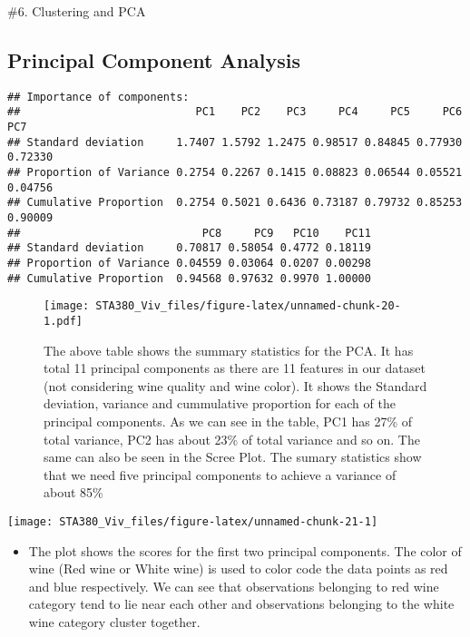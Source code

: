 \documentclass[
  12pt,
]{article}
\providecommand{\tightlist}{%
  \setlength{\itemsep}{0pt}\setlength{\parskip}{0pt}}
\begin{document}
\newpage

\#6. Clustering and PCA

\hypertarget{principal-component-analysis}{%
\subsection{Principal Component
Analysis}\label{principal-component-analysis}}

\begin{verbatim}
## Importance of components:
##                           PC1    PC2    PC3     PC4     PC5     PC6     PC7
## Standard deviation     1.7407 1.5792 1.2475 0.98517 0.84845 0.77930 0.72330
## Proportion of Variance 0.2754 0.2267 0.1415 0.08823 0.06544 0.05521 0.04756
## Cumulative Proportion  0.2754 0.5021 0.6436 0.73187 0.79732 0.85253 0.90009
##                            PC8     PC9   PC10    PC11
## Standard deviation     0.70817 0.58054 0.4772 0.18119
## Proportion of Variance 0.04559 0.03064 0.0207 0.00298
## Cumulative Proportion  0.94568 0.97632 0.9970 1.00000
\end{verbatim}

\begin{figure}
\centering
\texttt{[image: STA380\_Viv\_files/figure-latex/unnamed-chunk-20-1.pdf]}
\caption{The above table shows the summary statistics for the PCA. It
has total 11 principal components as there are 11 features in our
dataset (not considering wine quality and wine color). It shows the
Standard deviation, variance and cummulative proportion for each of the
principal components. As we can see in the table, PC1 has 27\% of total
variance, PC2 has about 23\% of total variance and so on. The same can
also be seen in the Scree Plot. The sumary statistics show that we need
five principal components to achieve a variance of about 85\%}
\end{figure}

\begin{center}\texttt{[image: STA380\_Viv\_files/figure-latex/unnamed-chunk-21-1]} \end{center}

\begin{itemize}
\tightlist
\item
  The plot shows the scores for the first two principal components. The
  color of wine (Red wine or White wine) is used to color code the data
  points as red and blue respectively. We can see that observations
  belonging to red wine category tend to lie near each other and
  observations belonging to the white wine category cluster together.
\end{itemize}
\end{document}
